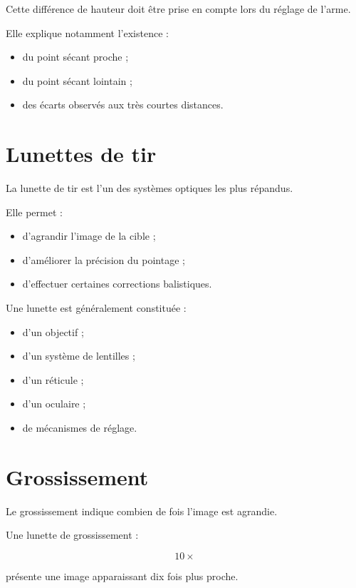 Cette différence de hauteur doit être prise en compte lors du réglage de
l'arme.

Elle explique notamment l'existence :

\begin{itemize}
    \item du point sécant proche ;
    \item du point sécant lointain ;
    \item des écarts observés aux très courtes distances.
\end{itemize}

\section{Lunettes de tir}

La lunette de tir est l'un des systèmes optiques les plus répandus.

Elle permet :

\begin{itemize}
    \item d'agrandir l'image de la cible ;
    \item d'améliorer la précision du pointage ;
    \item d'effectuer certaines corrections balistiques.
\end{itemize}

Une lunette est généralement constituée :

\begin{itemize}
    \item d'un objectif ;
    \item d'un système de lentilles ;
    \item d'un réticule ;
    \item d'un oculaire ;
    \item de mécanismes de réglage.
\end{itemize}

\section{Grossissement}

Le grossissement indique combien de fois l'image est agrandie.

\begin{exemple}

Une lunette de grossissement :

\begin{equation}
10\times
\end{equation}

présente une image apparaissant dix fois plus proche.

\end{exemple}

